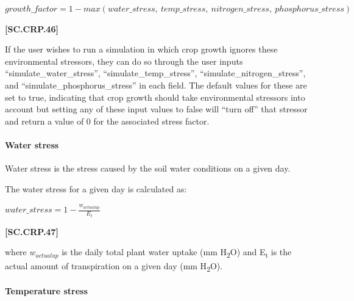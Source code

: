     \begin{center}
        \(growth\_factor=1 - max(water\_stress,\ temp\_stress,\ nitrogen\_stress,\ phosphorus\_stress) \) 
    \end{center}
        \vspace{0.5cm}
    
            {\raggedleft \textbf{[SC.CRP.46]}\par}
            \vspace{0.5cm}

If the user wishes to run a simulation in which crop growth ignores these environmental stressors, they can do so through the user inputs “simulate\_water\_stress”, “simulate\_temp\_stress”, “simulate\_nitrogen\_stress”, and “simulate\_phosphorus\_stress” in each field. The default values for these are set to true, indicating that crop growth should take environmental stressors into account but setting any of these input values to false will “turn off” that stressor and return a value of 0 for the associated stress factor.

\paragraph{Water stress}
\vspace{-0.25cm}

Water stress is the stress caused by the soil water conditions on a given day. 

The water stress for a given day is calculated as:
   \vspace{0.2cm}

    \begin{center}
        \(water\_stress=1-\frac{w_{actualup}}{E_t} \) 
    \end{center}
        \vspace{0.5cm}
    
            {\raggedleft \textbf{[SC.CRP.47]}\par}
            \vspace{0.5cm}

where \(w_{actualup}\)	is the daily total plant water uptake (mm H\textsubscript{2}O) and E\textsubscript{t} is the actual amount of transpiration on a given day (mm H\textsubscript{2}O).

\paragraph{Temperature stress}
\vspace{-0.25cm}

